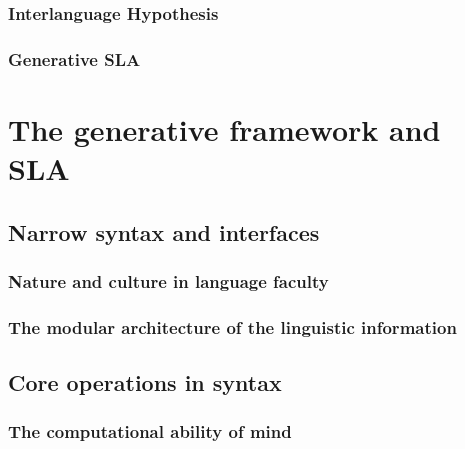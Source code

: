 \documentclass[
  a4paper,
  twoside,
  12pt,
  chapterprefix=false,
  bibliography=totocnumbered,
  listof=flat]{scrbook}
\begin{document}
\hypertarget{interlanguage-hypothesis}{%
\subsection{Interlanguage Hypothesis}\label{interlanguage-hypothesis}}

\hypertarget{generative-sla}{%
\subsection{Generative SLA}\label{generative-sla}}

\hypertarget{the-generative-framework-and-sla}{%
\chapter{The generative framework and SLA}\label{the-generative-framework-and-sla}}

\hypertarget{narrow-syntax-and-interfaces}{%
\section{Narrow syntax and interfaces}\label{narrow-syntax-and-interfaces}}

\hypertarget{nature-and-culture-in-language-faculty}{%
\subsection{Nature and culture in language faculty}\label{nature-and-culture-in-language-faculty}}

\hypertarget{the-modular-architecture-of-the-linguistic-information}{%
\subsection{The modular architecture of the linguistic information}\label{the-modular-architecture-of-the-linguistic-information}}

\hypertarget{core-operations-in-syntax}{%
\section{Core operations in syntax}\label{core-operations-in-syntax}}

\hypertarget{the-computational-ability-of-mind}{%
\subsection{The computational ability of mind}\label{the-computational-ability-of-mind}}
\end{document}
